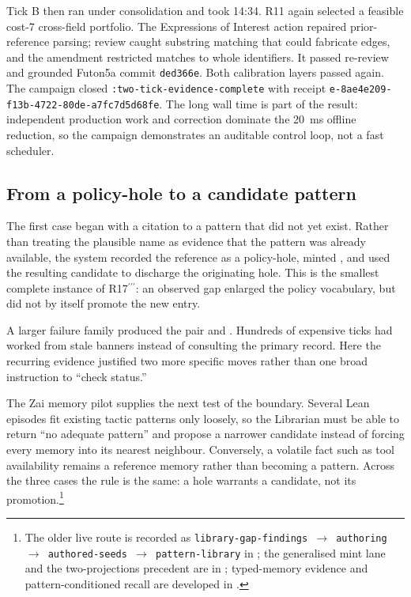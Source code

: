 Tick B then ran under consolidation and took 14:34.  R11 again selected a
feasible cost-7 cross-field portfolio.  The Expressions of Interest action
repaired prior-reference parsing; review caught substring matching that could
fabricate edges, and the amendment restricted matches to whole identifiers.
It passed re-review and grounded Futon5a commit \texttt{ded366e}.  Both
calibration layers passed again.  The campaign closed
\texttt{:two-tick-evidence-complete} with receipt
\texttt{e-8ae4e209-f13b-4722-80de-a7fc7d5d68fe}.  The long wall time is part of
the result: independent production work and correction dominate the 20~ms
offline reduction, so the campaign demonstrates an auditable control loop,
not a fast scheduler.

\subsection{From a policy-hole to a candidate pattern}

The first case began with a citation to a pattern that did not yet exist.
Rather than treating the plausible name as evidence that the pattern was
already available, the system recorded the reference as a policy-hole, minted
, and used the resulting
candidate to discharge the originating hole.  This is the smallest complete
instance of R17$^{\prime\prime\prime}$: an observed gap enlarged the policy
vocabulary, but did not by itself promote the new entry.

A larger failure family produced the pair
 and
.  Hundreds of expensive ticks
had worked from stale banners instead of consulting the primary record.  Here
the recurring evidence justified two more specific moves rather than one broad
instruction to ``check status.''

The Zai memory pilot supplies the next test of the boundary.  Several Lean
episodes fit existing tactic patterns only loosely, so the Librarian must be
able to return ``no adequate pattern'' and propose a narrower candidate instead
of forcing every memory into its nearest neighbour.  Conversely, a volatile
fact such as tool availability remains a reference memory rather than becoming
a pattern.  Across the three cases the rule is the same: a hole warrants a
candidate, not its promotion.\footnote{The older live route is recorded as
\texttt{library-gap-findings $\rightarrow$ authoring $\rightarrow$
authored-seeds $\rightarrow$ pattern-library} in
; the generalised mint lane and the
two-projections precedent are in
; typed-memory
evidence and pattern-conditioned recall are developed in
.}

